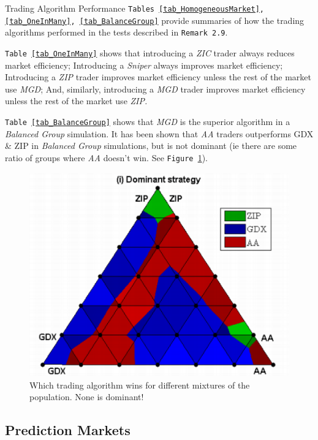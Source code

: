 \documentclass[11pt,a4paper]{article}
\begin{document}
  \begin{proposition}{Trading Algorithm Performance}
    \texttt{Tables \ref{tab_HomogeneousMarket}, \ref{tab_OneInMany}, \ref{tab_BalanceGroup}} provide summaries of how the trading algorithms performed in the tests described in \texttt{Remark 2.9}.
    \par \texttt{Table \ref{tab_OneInMany}} shows that introducing a \textit{ZIC} trader always reduces market efficiency; Introducing a \textit{Sniper} always improves market efficiency; Introducing a \textit{ZIP} trader improves market efficiency unless the rest of the market use \textit{MGD}; And, similarly, introducing a \textit{MGD} trader improves market efficiency unless the rest of the market use \textit{ZIP.}
    \par \texttt{Table \ref{tab_BalanceGroup}} shows that \textit{MGD} is the superior algorithm in a \textit{Balanced Group} simulation. It has been shown that \textit{AA} traders outperforms GDX \& ZIP in \textit{Balanced Group} simulations, but is not dominant (ie there are some ratio of groups where \textit{AA} doesn't win. See \texttt{Figure \ref{fig_DominantStrategy}}).
  \end{proposition}

  \begin{figure}[ht!]
    \centering
    \includegraphics[width=.3\textwidth]{DominantStrategy.PNG}
    \caption{Which trading algorithm wins for different mixtures of the population. None is dominant!}
    \label{fig_DominantStrategy}
  \end{figure}

\subsection{Prediction Markets} \label{sec_PredictionMarkets}
\end{document}
